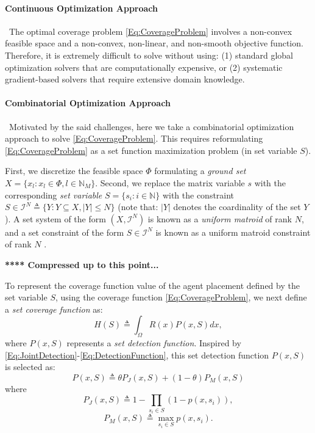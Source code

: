\documentclass[letterpaper, 10 pt, conference]{ieeeconf}
\newcommand{\N}{\mathbb{N}}
\begin{document}
\paragraph*{Continuous Optimization Approach}\ 
The optimal coverage problem \eqref{Eq:CoverageProblem} involves a non-convex feasible space and a non-convex, non-linear, and non-smooth objective function. Therefore, it is extremely difficult to solve without using: (1) standard global optimization solvers that are computationally expensive, or (2) systematic gradient-based solvers that require extensive domain knowledge. 

\paragraph*{Combinatorial Optimization Approach}\ Motivated by the said challenges, here we take a combinatorial optimization approach to solve \eqref{Eq:CoverageProblem}. This requires reformulating \eqref{Eq:CoverageProblem} as a set function maximization problem (in set variable $S$).


First, we discretize the feasible space $\Phi$ formulating a \emph{ground set} $X = \{x_l:x_l\in \Phi, l\in\N_M\}$. Second, we replace the matrix variable $s$ with the corresponding \emph{set variable} $S = \{s_i:i\in\N\}$ with the constraint $S \in \mathcal{I}^N \triangleq \{Y: Y \subseteq X, \vert Y \vert \leq N\}$ (note that: $\vert Y \vert$ denotes the coardinality of the set $Y$). A set system of the form $(X,\mathcal{I}^N)$ is known as a \emph{uniform matroid} of rank $N$, and a set constraint of the form $S\in\mathcal{I}^N$ is known as a uniform matroid constraint of rank $N$ \cite{WelikalaJ02021}.


\bigskip
{\color{blue} \textbf{**** Compressed up to this point...} }
\bigskip

To represent the coverage function value of the agent placement defined by the set variable $S$, using the coverage function \eqref{Eq:CoverageProblem}, we next define a \emph{set coverage function} as: 
\begin{equation}\label{Eq:SetCoverageFunction}
    H(S) \triangleq \int_\Omega R(x)P(x,S)dx,
\end{equation}
where $P(x,S)$ represents a \emph{set detection function}. Inspired by \eqref{Eq:JointDetection}-\eqref{Eq:DetectionFunction}, this set detection function $P(x,S)$ is selected as:
\begin{equation}\label{Eq:SetDetectionFunction}
P(x,S) \triangleq \theta P_J(x,S) + (1-\theta)P_M(x,S)
\end{equation}
where 
\begin{equation}\label{Eq:SetJointDetection}
P_J(x,S) \triangleq 1-\prod_{s_i\in S}(1-p(x,s_i)),
\end{equation}
\begin{equation}\label{Eq:SetMaxDetection}
P_M(x,S) \triangleq \max_{s_i\in S} p(x,s_i).    
\end{equation}
\end{document}
